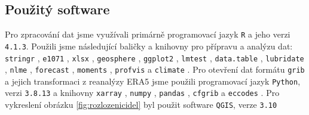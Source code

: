 \subsection{Použitý software}
Pro zpracování dat jsme využívali primárně programovací jazyk \texttt{R} \parencite{Rlanguage} a jeho verzi \texttt{4.1.3}. Použili jsme následující baličky a knihovny pro přípravu a analýzu dat: \texttt{stringr} \parencite{stringr}, \texttt{e1071} \parencite{e1071}, \texttt{xlsx} \parencite{xlsx}, \texttt{geosphere} \parencite{geosphere}, \texttt{ggplot2} \parencite{ggplot2}, \texttt{lmtest} \parencite{lmtest}, \texttt{data.table} \parencite{data.table}, \texttt{lubridate} \parencite{lubridate}, \texttt{nlme} \parencite{nlme}, \texttt{forecast} \parencite{forecast}, \texttt{moments} \parencite{moments}, \texttt{profvis} \parencite{profvis} a \texttt{climate} \parencite{climate}. Pro otevření dat formátu \texttt{grib} a jejich transformaci z reanalýzy ERA5 jsme použili programovací jazyk \texttt{Python}, verzi \texttt{3.8.13} \parencite{python} a knihovny \texttt{xarray} \parencite{xarray}, \texttt{numpy} \parencite{numpy}, \texttt{pandas} \parencite{pandas}, \texttt{cfgrib} \parencite{cfgrib} a \texttt{eccodes} \parencite{eccodes}. Pro vykreslení obrázku \ref{fig:rozlozenicidel} byl použit software \texttt{QGIS}, verze \texttt{3.10} \parencite{qgis}
